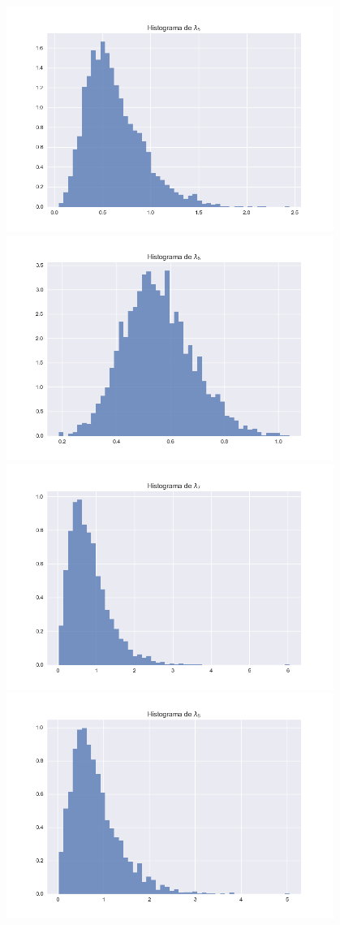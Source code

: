 \documentclass{article}
\begin{document}
\begin{enumerate}
\begin{center}
        \includegraphics[width=0.8\textwidth]{Tarea8/hist4.png}
        \includegraphics[width=0.8\textwidth]{Tarea8/hist5.png}
        \includegraphics[width=0.8\textwidth]{Tarea8/hist6.png}
        \includegraphics[width=0.8\textwidth]{Tarea8/hist7.png}

\end{center}
\end{enumerate}
\end{document}
